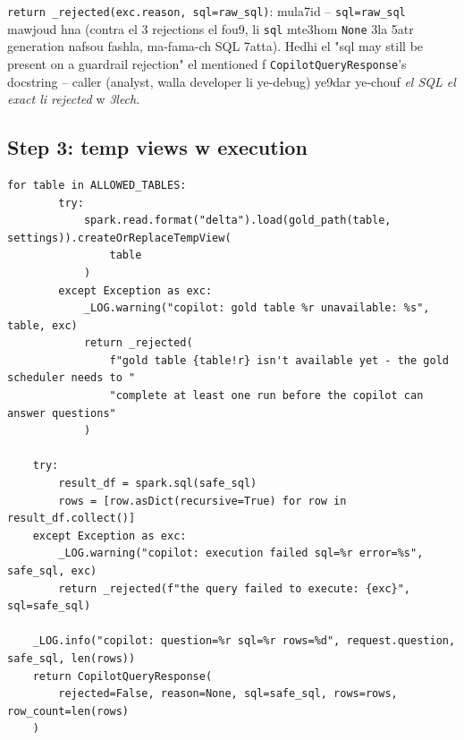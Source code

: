 \documentclass[11pt,a4paper]{report}
\DeclareRobustCommand{\code}[1]{\texttt{#1}}
\begin{document}
\code{return \_rejected(exc.reason, sql=raw\_sql)}: mula7id -- \code{sql=raw\_sql}
mawjoud hna (contra el 3 rejections el fou9, li \code{sql} mte3hom
\code{None} 3la 5atr generation nafsou fashla, ma-fama-ch SQL 7atta).
Hedhi el "sql may still be present on a guardrail rejection" el mentioned
f \code{CopilotQueryResponse}'s docstring -- caller (analyst, walla
developer li ye-debug) ye9dar ye-chouf \emph{el SQL el exact li rejected}
w \emph{3lech}.

\subsection{Step 3: temp views w execution}

\begin{lstlisting}[style=pystyle]
    for table in ALLOWED_TABLES:
        try:
            spark.read.format("delta").load(gold_path(table, settings)).createOrReplaceTempView(
                table
            )
        except Exception as exc:
            _LOG.warning("copilot: gold table %r unavailable: %s", table, exc)
            return _rejected(
                f"gold table {table!r} isn't available yet - the gold scheduler needs to "
                "complete at least one run before the copilot can answer questions"
            )

    try:
        result_df = spark.sql(safe_sql)
        rows = [row.asDict(recursive=True) for row in result_df.collect()]
    except Exception as exc:
        _LOG.warning("copilot: execution failed sql=%r error=%s", safe_sql, exc)
        return _rejected(f"the query failed to execute: {exc}", sql=safe_sql)

    _LOG.info("copilot: question=%r sql=%r rows=%d", request.question, safe_sql, len(rows))
    return CopilotQueryResponse(
        rejected=False, reason=None, sql=safe_sql, rows=rows, row_count=len(rows)
    )
\end{lstlisting}
\end{document}
